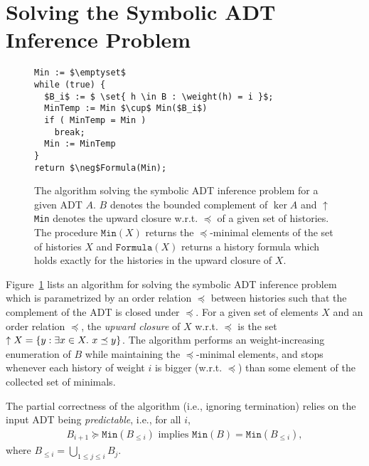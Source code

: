 \section{Solving the Symbolic ADT Inference Problem}

\begin{figure}
\begin{lstlisting}
Min := $\emptyset$
while (true) {
  $B_i$ := $ \set{ h \in B : \weight(h) = i }$;
  MinTemp := Min $\cup$ Min($B_i$)
  if ( MinTemp = Min )
    break;
  Min := MinTemp
}
return $\neg$Formula(Min);
\end{lstlisting}
\caption{The algorithm solving the symbolic ADT inference problem for a given ADT $A$. $B$ denotes the bounded complement of $\ker A$ and $\uparrow$\texttt{Min} denotes the upward closure w.r.t. $\preceq$ of a given set of histories. The procedure $\texttt{Min}(X)$ returns the $\preceq$-minimal elements of the set of histories $X$ and $\texttt{Formula}(X)$ returns a history formula which holds exactly for the histories in the upward closure of $X$.} 
\label{fig:algorithm}
\end{figure}

Figure~\ref{fig:algorithm} lists an algorithm for solving the symbolic ADT inference problem which is parametrized by 
an order relation $\preceq$ between histories such that the complement of the ADT 
is closed under $\preceq$. For a given set of elements $X$ and an order relation $\preceq$, the \emph{upward closure}
of $X$ w.r.t. $\preceq$ is the set $\uparrow X={\{{y : \exists x\in X.\ x\preceq y}\}}$. The algorithm performs an
weight-increasing enumeration of $B$ while maintaining the
$\preceq$-minimal elements, and stops whenever each history of weight $i$ is bigger (w.r.t. $\preceq$) than some
element of the collected set of minimals.

The partial correctness of the algorithm (i.e., ignoring termination) relies on the input ADT being \emph{predictable}, i.e.,
for all $i$,
\begin{align*}
B_{i+1} \succeq \texttt{Min}(B_{\leq i}) \mbox{ implies } \texttt{Min}(B) = \texttt{Min}(B_{\leq i}),
\end{align*}
where $B_{\leq i}=\bigcup_{1\leq j\leq i}B_j$.

